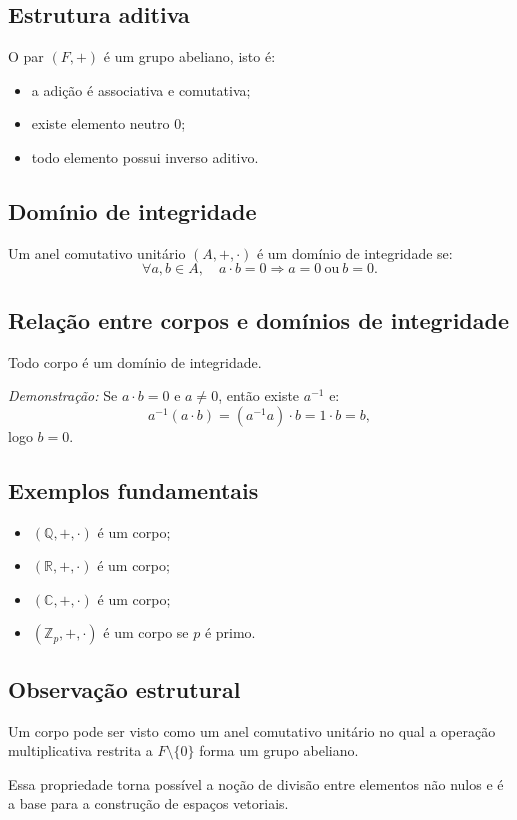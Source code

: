 \documentclass[../../main]{subfiles}
\begin{document}
\subsection{Estrutura aditiva}

O par $(F,+)$ é um grupo abeliano, isto é:

\begin{itemize}
	\item a adição é associativa e comutativa;
	\item existe elemento neutro $0$;
	\item todo elemento possui inverso aditivo.
\end{itemize}

\subsection{Domínio de integridade}

Um anel comutativo unitário $(A,+,\cdot)$ é um domínio de integridade se:
\[
	\forall a,b \in A,\quad a \cdot b = 0 \Rightarrow a = 0 \ \text{ou}\ b = 0.
\]

\subsection{Relação entre corpos e domínios de integridade}

Todo corpo é um domínio de integridade.

\textit{Demonstração:}
Se $a \cdot b = 0$ e $a \neq 0$, então existe $a^{-1}$ e:
\[
	a^{-1}(a \cdot b) = (a^{-1}a)\cdot b = 1 \cdot b = b,
\]
logo $b = 0$.

\subsection{Exemplos fundamentais}

\begin{itemize}
	\item $(\mathbb{Q}, +, \cdot)$ é um corpo;
	\item $(\mathbb{R}, +, \cdot)$ é um corpo;
	\item $(\mathbb{C}, +, \cdot)$ é um corpo;
	\item $(\mathbb{Z}_p, +, \cdot)$ é um corpo se $p$ é primo.
\end{itemize}

\subsection{Observação estrutural}

Um corpo pode ser visto como um anel comutativo unitário no qual a operação multiplicativa restrita a $F \setminus \{0\}$ forma um grupo abeliano.

Essa propriedade torna possível a noção de divisão entre elementos não nulos e é a base para a construção de espaços vetoriais.
\end{document}
